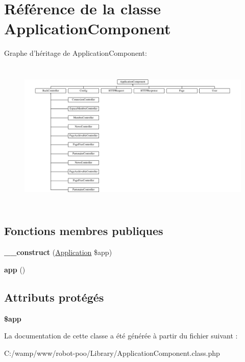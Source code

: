 \hypertarget{class_library_1_1_application_component}{\section{Référence de la classe Application\+Component}
\label{class_library_1_1_application_component}
}
Graphe d'héritage de Application\+Component\+:\begin{figure}[H]
\begin{center}
\leavevmode
\includegraphics[height=7.265469cm]{class_library_1_1_application_component}
\end{center}
\end{figure}
\subsection*{Fonctions membres publiques}
\begin{DoxyCompactItemize}
\item 
\hypertarget{class_library_1_1_application_component_a2649bea9628906af84eedc23f383af8e}{{\bfseries \+\_\+\+\_\+construct} (\hyperlink{class_library_1_1_application}{Application} \$app)}\label{class_library_1_1_application_component_a2649bea9628906af84eedc23f383af8e}

\item 
\hypertarget{class_library_1_1_application_component_a0b328204f1494443b4573c43d2bab29e}{{\bfseries app} ()}\label{class_library_1_1_application_component_a0b328204f1494443b4573c43d2bab29e}

\end{DoxyCompactItemize}
\subsection*{Attributs protégés}
\begin{DoxyCompactItemize}
\item 
\hypertarget{class_library_1_1_application_component_adfb117f244076aa9bc269269f7e57403}{{\bfseries \$app}}\label{class_library_1_1_application_component_adfb117f244076aa9bc269269f7e57403}

\end{DoxyCompactItemize}


La documentation de cette classe a été générée à partir du fichier suivant \+:\begin{DoxyCompactItemize}
\item 
C\+:/wamp/www/robot-\/poo/\+Library/Application\+Component.\+class.\+php\end{DoxyCompactItemize}
